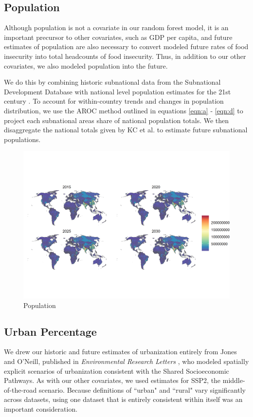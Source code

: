 \documentclass{article}
\begin{document}
\subsection{Population}
Although population is not a covariate in our random forest model, it is an important precursor to other covariates, such as GDP per capita, and future estimates of population are also necessary to convert modeled future rates of food insecurity into total headcounts of food insecurity.  Thus, in addition to our other covariates, we also modeled population into the future.

We do this by combining historic subnational data from the Subnational Development Database \citep{Smits2019} with national level population estimates for the 21st century \citep{KC2017}.  To account for within-country trends and changes in population distribution, we use the AROC method outlined in equations \ref{eqn:a} - \ref{eqn:d} to project each subnational areas share of national population totals. We then disaggregate the national totals given by KC et al. to estimate future subnational populations.

\begin{figure}[H]
  \centering
  \includegraphics[width=\linewidth]{img/covars/population.png}
  \caption{Population}
\end{figure}

\subsection{Urban Percentage}

We drew our historic and future estimates of urbanization entirely from Jones and O'Neill, published in \textit{Environmental Research Letters} \citep{Jones2016}, who modeled spatially explicit scenarios of urbanization consistent with the Shared Socioeconomic Pathways.  As with our other covariates, we used estimates for SSP2, the middle-of-the-road scenario.  Because definitions of ``urban" and ``rural" vary significantly across datasets, using one dataset that is entirely consistent within itself was an important consideration.
\end{document}
